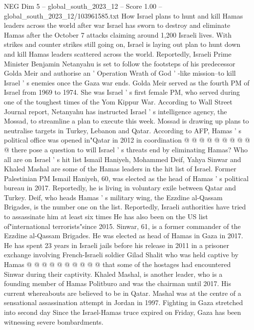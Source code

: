 \begin{textsample}{NEG Dim 5 – global\_south\_2023\_12 – Score 1.00 – global\_south\_2023\_12/103961585.txt}  \label{ex:f5_neg_238}
How Israel plans to hunt and kill Hamas leaders across the world after war Israel has sworn to destroy and eliminate Hamas after the October 7 attacks claiming around 1,200 Israeli lives.
With strikes and counter strikes still going on, Israel is laying out plan to hunt down and kill Hamas leaders scattered across the world.
Reportedly, Israeli Prime Minister Benjamin Netanyahu is set to follow the footsteps of his predecessor Golda Meir and authorise an ' Operation Wrath of God ' -like mission--to kill Israel ' s enemies once the Gaza war ends.
Golda Meir served as the fourth PM of Israel from 1969 to 1974.
She was Israel ' s first female PM, who served during one of the toughest times of the Yom Kippur War.
According to Wall Street Journal report, Netanyahu has instructed Israel ' s intelligence agency, the Mossad, to streamline a plan to execute this week.
Mossad is drawing up plans to neutralise targets in Turkey, Lebanon and Qatar.
According to AFP, Hamas ' s political office was opened in"Qatar in 2012 in coordination @ @ @ @ @ @ @ @ @ @ there pose a question to will Israel ' s threats end by eliminating Hamas?
Who all are on Israel ' s hit list Ismail Haniyeh, Mohammed Deif, Yahya Sinwar and Khaled Mashal are some of the Hamas leaders in the hit list of Israel.
Former Palestinian PM Ismail Haniyeh, 60, was elected as the head of Hamas ' s political bureau in 2017.
Reportedly, he is living in voluntary exile between Qatar and Turkey.
Deif, who heads Hamas ' s military wing, the Ezzdine al-Qassam Brigades, is the number one on the list.
Reportedly, Israeli authorities have tried to assassinate him at least six times He has also been on the US list of"international terrorists"since 2015.
Sinwar, 61, is a former commander of the Ezzdine al-Qassam Brigades.
He was elected as head of Hamas in Gaza in 2017.
He has spent 23 years in Israeli jails before his release in 2011 in a prisoner exchange involving French-Israeli soldier Gilad Shalit who was held captive by Hamas @ @ @ @ @ @ @ @ @ @ that some of the hostages had encountered Sinwar during their captivity.
Khaled Mashal, is another leader, who is a founding member of Hamas Politburo and was the chairman until 2017.
His current whereabouts are believed to be in Qatar.
Mashal was at the centre of a sensational assassination attempt in Jordan in 1997.
Fighting in Gaza stretched into second day Since the Israel-Hamas truce expired on Friday, Gaza has been witnessing severe bombardments.

\end{textsample}
